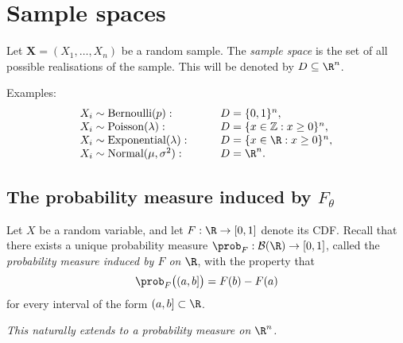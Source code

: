
\section{Sample spaces}

\begin{definition}
Let $\mathbf{X}=(X_1,\ldots,X_n)$ be a random sample. The \emph{sample space} is the set of all possible realisations of the sample. This will be denoted by $D\subseteq\R^n$.
\end{definition}

Examples:
\[
\begin{array}{ll}
X_i\sim\text{Bernoulli}(p):					& \qquad D = \{0,1\}^n, \\
X_i\sim\text{Poisson}(\lambda):			& \qquad D = \{x\in\mathbb{Z}: x\geq 0\}^n, \\
X_i\sim\text{Exponential}(\lambda):		& \qquad D = \{x\in\R:x\geq 0\}^n, \\
X_i\sim\text{Normal}(\mu,\sigma^2):		& \qquad D = \R^n.
\end{array}
\]


\subsection{The probability measure induced by $F_{\theta}$}

Let $X$ be a random variable, and let $F:\R\to[0,1]$ denote its CDF. Recall that there exists a unique probability measure $\prob_F:\mathcal{B}(\R)\to[0,1]$, called the \emph{probability measure induced by $F$ on $\R$}, with the property that
\[
\prob_F\big((a,b]\big) = F(b) - F(a)%
\]
for every interval of the form $(a,b]\subset\R$.

\vspace*{1ex}
\bit
\it This naturally extends to a probability measure on $\R^n$.
\eit
\vspace*{1ex}

